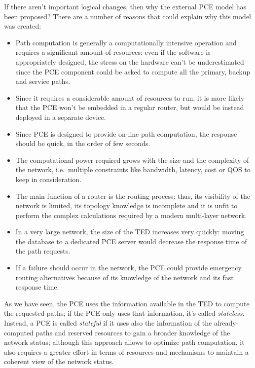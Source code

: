 \documentclass[10pt,a4paper]{report}
\begin{document}
If there aren't important logical changes, then why the external PCE
model has been proposed? There are a number of reasons that could
explain why this model was created:
\begin{itemize}
\item Path computation is generally a computationally intensive
  operation and requires a significant amount of resources: even if
  the software is appropriately designed, the stress on the hardware
  can't be underestimated since the PCE component could be asked to
  compute all the primary, backup and service paths.
\item Since it requires a considerable amount of resources to run, it
  is more likely that the PCE won't be embedded in a regular router,
  but would be instead deployed in a separate device.
\item Since PCE is designed to provide on-line path computation, the
  response should be quick, in the order of few seconds.
\item The computational power required grows with the size and the
  complexity of the network, i.e.\ multiple constraints like
  bandwidth, latency, cost or QOS to keep in consideration.
\item The main function of a router is the routing process: thus, its
  visibility of the network is limited, its topology knowledge is
  incomplete and it is unfit to perform the complex calculations
  required by a modern multi-layer network.
\item In a very large network, the size of the TED increases very
  quickly: moving the database to a dedicated PCE server would
  decrease the response time of the path requests.
\item If a failure should occur in the network, the PCE could provide
  emergency routing alternatives because of its knowledge of the
  network and its fast response time.
\end{itemize}

As we have seen, the PCE uses the information available in the TED to
compute the requested paths; if the PCE only uses that information,
it's called \textit{stateless}. Instead, a PCE is called
\textit{stateful} if it uses also the information of the
already-computed paths and reserved resources to gain a broader
knowledge of the network status; although this approach allows to
optimize path computation, it also requires a greater effort in terms
of resources and mechanisms to maintain a coherent view of the network
status.
\end{document}
